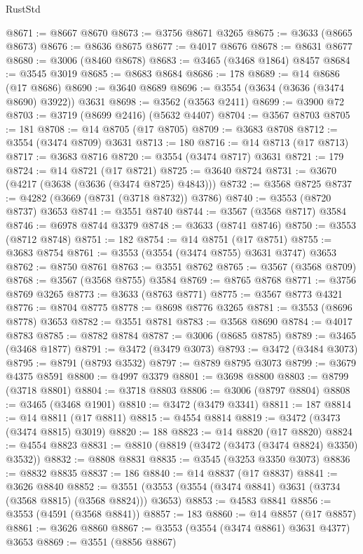 \begin{lexlean}{RustStd}
\begin{coremodule}
@8671 := @8667 @8670
@8673 := @3756 @8671 @3265
@8675 := @3633 (@8665 @8673)
@8676 := @8636 @8675
@8677 := @4017 @8676
@8678 := @8631 @8677
@8680 := @3006 (@8460 @8678)
@8683 := @3465 (@3468 @1864) @8457
@8684 := @3545 @3019
@8685 := @8683 @8684
@8686 := 178
@8689 := @14 @8686 (@17 @8686)
@8690 := @3640 @8689
@8696 := @3554 (@3634 (@3636 (@3474 @8690) @3922)) @3631
@8698 := @3562 (@3563 @2411)
@8699 := @3900 @72
@8703 := @3719 (@8699 @2416) (@5632 @4407)
@8704 := @3567 @8703
@8705 := 181
@8708 := @14 @8705 (@17 @8705)
@8709 := @3683 @8708
@8712 := @3554 (@3474 @8709) @3631
@8713 := 180
@8716 := @14 @8713 (@17 @8713)
@8717 := @3683 @8716
@8720 := @3554 (@3474 @8717) @3631
@8721 := 179
@8724 := @14 @8721 (@17 @8721)
@8725 := @3640 @8724
@8731 := @3670 (@4217 (@3638 (@3636 (@3474 @8725) @4843)))
@8732 := @3568 @8725
@8737 := @4282 (@3669 (@8731 (@3718 @8732)) @3786)
@8740 := @3553 (@8720 @8737) @3653
@8741 := @3551 @8740
@8744 := @3567 (@3568 @8717) @3584
@8746 := @6978 @8744 @3379
@8748 := @3633 (@8741 @8746)
@8750 := @3553 (@8712 @8748)
@8751 := 182
@8754 := @14 @8751 (@17 @8751)
@8755 := @3683 @8754
@8761 := @3553 (@3554 (@3474 @8755) @3631 @3747) @3653
@8762 := @8750 @8761
@8763 := @3551 @8762
@8765 := @3567 (@3568 @8709)
@8768 := @3567 (@3568 @8755) @3584
@8769 := @8765 @8768
@8771 := @3756 @8769 @3265
@8773 := @3633 (@8763 @8771)
@8775 := @3567 @8773 @4321
@8776 := @8704 @8775
@8778 := @8698 @8776 @3265
@8781 := @3553 (@8696 @8778) @3653
@8782 := @3551 @8781
@8783 := @3568 @8690
@8784 := @4017 @8783
@8785 := @8782 @8784
@8787 := @3006 (@8685 @8785)
@8789 := @3465 (@3468 @1877)
@8791 := @3472 (@3479 @3073)
@8793 := @3472 (@3484 @3073)
@8795 := @8791 (@8793 @3532)
@8797 := @8789 @8795 @3073
@8799 := @3679 @4375 @8591
@8800 := @4997 @3379
@8801 := @3698 @8800
@8803 := @8799 (@3718 @8801)
@8804 := @3718 @8803
@8806 := @3006 (@8797 @8804)
@8808 := @3465 (@3468 @1901)
@8810 := @3472 (@3479 @3341)
@8811 := 187
@8814 := @14 @8811 (@17 @8811)
@8815 := @4554 @8814
@8819 := @3472 (@3473 (@3474 @8815) @3019)
@8820 := 188
@8823 := @14 @8820 (@17 @8820)
@8824 := @4554 @8823
@8831 := @8810 (@8819 (@3472 (@3473 (@3474 @8824) @3350) @3532))
@8832 := @8808 @8831
@8835 := @3545 (@3253 @3350 @3073)
@8836 := @8832 @8835
@8837 := 186
@8840 := @14 @8837 (@17 @8837)
@8841 := @3626 @8840
@8852 := @3551 (@3553 (@3554 (@3474 @8841) @3631 (@3734 (@3568 @8815) (@3568 @8824))) @3653)
@8853 := @4583 @8841
@8856 := @3553 (@4591 (@3568 @8841))
@8857 := 183
@8860 := @14 @8857 (@17 @8857)
@8861 := @3626 @8860
@8867 := @3553 (@3554 (@3474 @8861) @3631 @4377) @3653
@8869 := @3551 (@8856 @8867)

\end{coremodule}
\end{lexlean}
